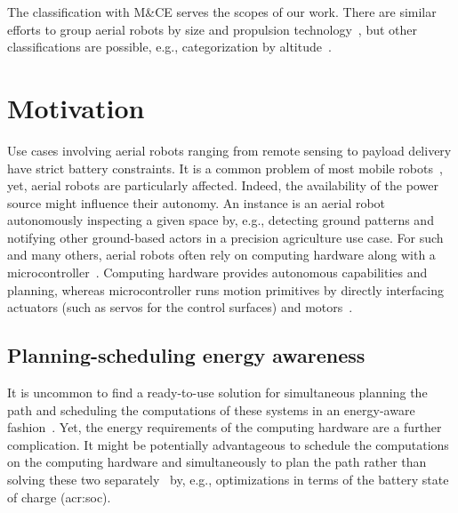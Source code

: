 The classification with M\&CE serves the scopes of our work. There are similar efforts to group aerial robots by size and propulsion technology~\citep{hoffer2014survey,cabreira2019survey}, but other classifications are possible, e.g., categorization by altitude~\citep{watts2012unmanned}.


\section{Motivation}
\label{sec:motivation}

Use cases involving aerial robots ranging from remote sensing to payload delivery have strict battery constraints. It is a common problem of most mobile robots~\citep{mei2006energy}, yet, aerial robots are particularly affected. Indeed, the availability of the power source might influence their autonomy. An instance is an aerial robot autonomously inspecting a given space by, e.g., detecting ground patterns and notifying other ground-based actors in a precision agriculture use case. For such and many others, aerial robots often rely on computing hardware along with a microcontroller~\citep{dharmadhikari2020motion,william2019aerial,papachristos2015aerial,holper2017cyber}. Computing hardware provides autonomous capabilities and planning, whereas microcontroller runs motion primitives by directly interfacing actuators (such as servos for the control surfaces) and motors~\citep{mei2005case}.

\subsection{Planning-scheduling energy awareness}

It is uncommon to find a ready-to-use solution for simultaneous planning the path and scheduling the computations of these systems in an energy-aware fashion~\citep{brateman2006energy,sudhakar2020balancing}. Yet, the energy requirements of the computing hardware are a further complication. It might be potentially advantageous to schedule the computations on the computing hardware and simultaneously to plan the path rather than solving these two separately~\citep{lahijanian2018resource,ondruska2015scheduled} by, e.g., optimizations in terms of the battery state of charge (\Gls{acr:soc}). 

